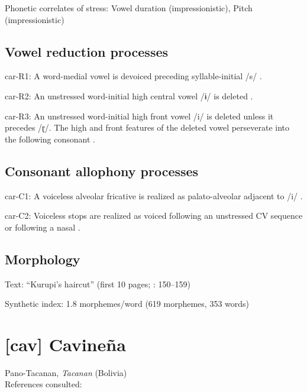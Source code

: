 {\begin{appendixdesc}
\item[Phonetic correlates of stress:] Vowel duration (impressionistic), Pitch (impressionistic)
\end{appendixdesc}
\subsection*{Vowel reduction processes}
\begin{appendixdesc}

\item[car-R1:] A word-medial vowel is devoiced preceding syllable-initial /s/ \citep[38]{Peasgood1972}.

\item[car-R2:] An unstressed word-initial high central vowel /ɨ/ is deleted \citep[40]{Courtz2008}.

\item[car-R3:] An unstressed word-initial high front vowel /i/ is deleted unless it precedes /ɽ/. The high and front features of the deleted vowel perseverate into the following consonant \citep[41]{Courtz2008}.
\end{appendixdesc}
\subsection*{Consonant allophony processes}
\begin{appendixdesc}

\item[car-C1:] A voiceless alveolar fricative is realized as palato-alveolar adjacent to /i/ \citep[32]{Courtz2008}.

\item[car-C2:] Voiceless stops are realized as voiced following an unstressed CV sequence or following a nasal \citep[31]{Courtz2008}.
\end{appendixdesc}
\subsection*{Morphology}

\begin{appendixdesc}

\item[Text:] “Kurupi’s haircut” (first 10 pages; \citealt{Courtz2008}: 150--159)

\item[Synthetic index:] 1.8 morphemes/word (619 morphemes, 353 words)
\end{appendixdesc}
\section*{[cav] Cavineña}  %
Pano-Tacanan, \textit{Tacanan} (Bolivia)\medskip\\
References consulted: \citet{Guillaume2008}

}
